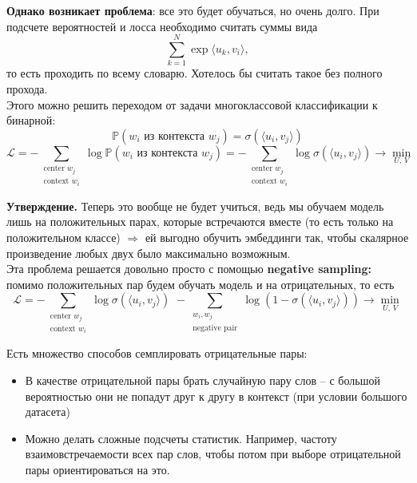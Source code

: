 \documentclass[12pt]{article}
\theoremstyle{definition} %
\theoremstyle{plain} %
\theoremstyle{remark} %
\begin{document}
    \textbf{Однако возникает проблема}: все это будет обучаться, но очень долго. При подсчете вероятностей и лосса необходимо считать суммы вида
    \[
    {\sum_{k=1}^N \exp \langle u_k, v_i \rangle},
    \]
    то есть проходить по всему словарю. Хотелось бы считать такое без полного прохода. \\

    Этого можно решить переходом от задачи многоклассовой классификации к бинарной:
    \[
    \mathbb{P}(w_i \text{ из контекста } w_j) = \sigma(\langle u_i, v_j \rangle)
    \]
    \[
    \mathcal{L} = - \sum_{\substack{\text{center } w_j \\ \text{context } w_i}} \log \mathbb{P}(w_i \text{ из контекста } w_j) = - \sum_{\substack{\text{center } w_j \\ \text{context } w_i}} \log \sigma(\langle u_i, v_j \rangle) \longrightarrow \min_{U, \, V}
    \]

    \pagebreak

    \textbf{Утверждение.} Теперь это вообще не будет учиться, ведь мы обучаем модель лишь на положительных парах, которые встречаются вместе (то есть только на положительном классе) $\Rightarrow$ ей выгодно обучить эмбеддинги так, чтобы скалярное произведение любых двух было максимально возможным. \\

    Эта проблема решается довольно просто с помощью \textbf{negative sampling:} помимо положительных пар будем обучать модель и на отрицательных, то есть
    \[
    \mathcal{L}  = - \sum_{\substack{\text{center } w_j \\ \text{context } w_i}} \log \sigma(\langle u_i, v_j \rangle) \,\, - \sum_{\substack{w_i, w_j \\ \text{negative pair}}} \log\left(1-\sigma(\langle u_i, v_j \rangle)\right) \longrightarrow \min_{U, \, V}
    \]

    Есть множество способов семплировать отрицательные пары:

    \begin{itemize}
        \item В качестве отрицательной пары брать случайную пару слов -- с большой вероятностью они не попадут друг к другу в контекст (при условии большого датасета)
        \item Можно делать сложные подсчеты статистик. Например, частоту взаимовстречаемости всех пар слов, чтобы потом при выборе отрицательной пары ориентироваться на это.
    \end{itemize}
\end{document}
